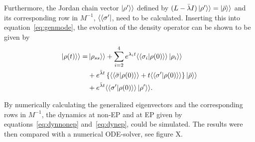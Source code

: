 \documentclass[../main.tex]{subfiles}
\begin{document}
Furthermore, the Jordan chain vector $\ket{\rho'}\rangle$ defined by $(L - \bar\lambda I)\ket{\rho'}\rangle = \ket{\bar\rho}\rangle$ and its corresponding row in $M^{-1}$, $\langle\bra{\sigma'}$, need to be calculated. Inserting this into equation~\eqref{eq:genmode}, the evolution of the density operator can be shown to be given by
\begin{equation}\label{eq:dynep}
    \begin{aligned}
        \ket{\rho(t)}\rangle = &\ket{\rho_{ss}}\rangle + \sum_{i=2}^4 e^{\lambda_i t} \langle\braket{\sigma_i|\rho(0)}\rangle \ket{\rho_i}\rangle \\ 
                               & + e^{\bar \lambda t}\left\{\langle\braket{\bar\sigma|\rho(0)}\rangle + t\langle\braket{\sigma'|\rho(0)}\rangle \right\}\ket{\bar \rho}\rangle \\ 
                               & + e^{\bar\lambda t} \langle\braket{\sigma'|\rho(0)}\rangle\ket{\rho'}\rangle.
    \end{aligned}
\end{equation}

By numerically calculating the generalized eigenvectors and the corresponding rows in $M^{-1}$, the dynamics at non-EP and at EP given by equations~\eqref{eq:dynnonep} and~\eqref{eq:dynep}, could be simulated. The results were then compared with a numerical ODE-solver, see figure X.
\end{document}

